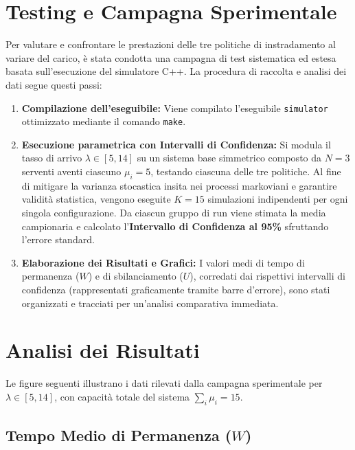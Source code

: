 \documentclass[12pt,a4paper]{article}
\begin{document}
\section{Testing e Campagna Sperimentale}

Per valutare e confrontare le prestazioni delle tre politiche di instradamento al variare del carico, è stata condotta una campagna di test sistematica ed estesa basata sull'esecuzione del simulatore C++. La procedura di raccolta e analisi dei dati segue questi passi:

\begin{enumerate}
  \item \textbf{Compilazione dell'eseguibile:}
        Viene compilato l'eseguibile \texttt{simulator} ottimizzato mediante il comando \texttt{make}.

  \item \textbf{Esecuzione parametrica con Intervalli di Confidenza:}
        Si modula il tasso di arrivo $\lambda \in [5, 14]$ su un sistema base simmetrico composto da $N = 3$ serventi aventi ciascuno $\mu_i = 5$, testando ciascuna delle tre politiche. Al fine di mitigare la varianza stocastica insita nei processi markoviani e garantire validità statistica, vengono eseguite $K = 15$ simulazioni indipendenti per ogni singola configurazione. Da ciascun gruppo di run viene stimata la media campionaria e calcolato l'\textbf{Intervallo di Confidenza al 95\%} sfruttando l'errore standard.

        \newpage
  \item \textbf{Elaborazione dei Risultati e Grafici:}
        I valori medi di tempo di permanenza ($W$) e di sbilanciamento ($U$), corredati dai rispettivi intervalli di confidenza (rappresentati graficamente tramite barre d'errore), sono stati organizzati e tracciati per un'analisi comparativa immediata.
\end{enumerate}

\section{Analisi dei Risultati}

Le figure seguenti illustrano i dati rilevati dalla campagna sperimentale per $\lambda \in [5, 14]$, con capacità totale del sistema $\sum_i \mu_i = 15$.

\subsection{Tempo Medio di Permanenza \texorpdfstring{($W$)}{(W)}}
\end{document}
